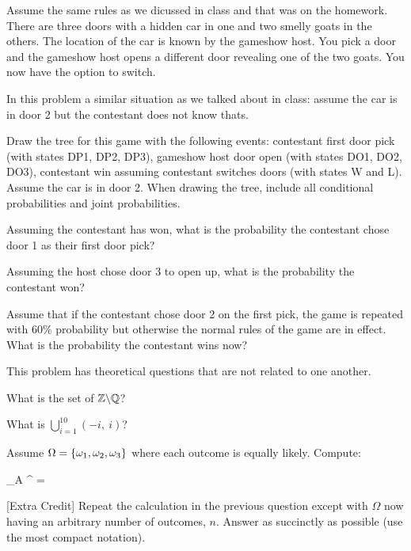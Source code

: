 \documentclass[12pt]{article}
\begin{document}
Assume the same rules as we dicussed in class and that was on the homework. There are three doors with a hidden car in one and two smelly goats in the others. The location of the car is known by the gameshow host. You pick a door and the gameshow host opens a different door revealing one of the two goats. You now have the option to switch.

In this problem a similar situation as we talked about in class: assume the car is in door 2 but the contestant does not know thats.

\benum
{} Draw the tree for this game with the following events: contestant first door pick (with states DP1, DP2, DP3), gameshow host door open (with states DO1, DO2, DO3), contestant win assuming contestant switches doors (with states W and L). Assume the car is in door 2. When drawing the tree, include all conditional probabilities and joint probabilities.

 Assuming the contestant has won, what is the probability the contestant chose door 1 as their first door pick?

 Assuming the host chose door 3 to open up, what is the probability the contestant won?


 Assume that if the contestant chose door 2 on the first pick, the game is repeated with 60\% probability but otherwise the normal rules of the game are in effect. What is the probability the contestant wins now?


\eenum

\problem This problem has theoretical questions that are not related to one another.

\benum

 What is the set of $\mathbb{Z} \backslash \mathbb{Q}$?


 What is $\bigcup_{i=1}^{10} (-i,~i)$?

 Assume $\Omega = \left\{\omega_1, \omega_2, \omega_3\right\}$ where each outcome is equally likely. Compute:

\beqn
\sum_{A ^\Omega}  = \hspace{400px}
\eeqn{}


 [Extra Credit] Repeat the calculation in the previous question except with $\Omega$ now having an arbitrary number of outcomes, $n$. Answer as succinctly as possible (use the most compact notation). 
\end{document}
